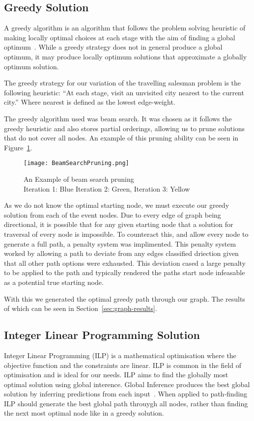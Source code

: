 \documentclass[bsc,frontabs,twoside,singlespacing,parskip,deptreport]{infthesis}     %
\begin{document}
\subsection{Greedy Solution}
A greedy algorithm is an algorithm that follows the problem solving heuristic of making locally optimal choices at each stage with the aim
of finding a global optimum~\cite{black2004dictionary}.
While a greedy strategy does not in general produce a global optimum, it may produce locally optimum solutions that approximate a globally optimum solution.


The greedy strategy for our variation of the travelling salesman problem is the following heuristic:
``At each stage, visit an unvisited city nearest to the current city.''
Where nearest is defined as the lowest edge-weight.


The greedy algorithm used was beam search.
It was chosen as it follows the greedy heuristic and also stores partial orderings,
allowing us to prune solutions that do not cover all nodes.
An example of this pruning ability can be seen in Figure~\ref{fig:beam-prune}.

\begin{figure}
  \centering
  \texttt{[image: BeamSearchPruning.png]}
  \caption{An Example of beam search pruning\\ Iteration 1: Blue Iteration 2: Green, Iteration 3: Yellow}
  \label{fig:beam-prune}
\end{figure}

As we do not know the optimal starting node, we must execute our greedy solution from each of the event nodes.
Due to every edge of graph being directional, it is possible that for any given starting node that a solution for traversal
of every node is impossible. To counteract this, and allow every node to generate a full path, a penalty system was implimented.
This penalty system worked by allowing a path to deviate from any edges classified driection given that all other path options
were exhausted. This deviation cased a large penalty to be applied to the path and typically rendered the paths start node
infeasable as a potential true starting node. 

With this we generated the optimal greedy path through our graph. The results of which can be seen in Section~\ref{sec:graph-results}.

\subsection{Integer Linear Programming Solution}
Integer Linear Programming (ILP) is a mathematical optimisation where the objective function and the constraints are linear.
ILP is common in the field of optimisation and is ideal for our needs. ILP aims to find the globally most optimal solution using global interence.
Global Inference produces the best global solution by inferring predictions from each input~\cite{roth2004linear}.%
When applied to path-finding ILP should generate the best global path throuygh all nodes, rather than finding the next most optimal node like in a greedy solution.
\end{document}
